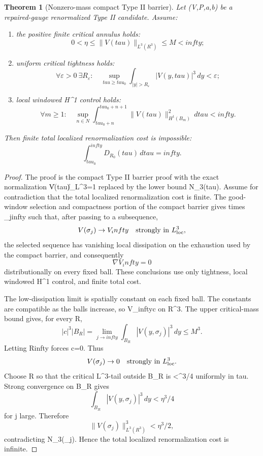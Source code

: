 \documentclass[11pt]{amsart}
\def\({}%
\def\){}%
\def\tilde#1{#1}%
\def\mathfrak#1{#1}%
\def\mathbb#1{#1}%
\def\tau{tau}%
\def\infty{infty}%
\theoremstyle{plain}
\newtheorem{theorem}{Theorem}[section]
\theoremstyle{definition}
\theoremstyle{remark}
\begin{document}
\begin{theorem}[Nonzero-mass compact Type II barrier]
\label{thm:c3-nonzero-mass-barrier}
Let \((V,P,a,b)\) be a repaired-gauge renormalized Type II candidate.  Assume:
\begin{enumerate}[label=\textup{(\roman*)}]
\item the positive finite critical annulus holds:
\[
  0<\eta\le \|V(\tau)\|_{L^3(\mathbb R^3)}\le M<\infty;
\]
\item uniform critical tightness holds:
\[
  \forall\varepsilon>0\ \exists R_\varepsilon:\quad
  \sup_{\tau\ge\tau_0}
  \int_{|y|>R_\varepsilon}|V(y,\tau)|^3\,dy<\varepsilon;
\]
\item local windowed \(H^1\) control holds:
\[
  \forall m\ge1:\quad
  \sup_{n\in\mathbb N}
  \int_{\tau_0+n}^{\tau_0+n+1}
  \|V(\tau)\|_{H^1(B_m)}^2\,d\tau<\infty.
\]
\end{enumerate}
Then finite total localized renormalization cost is impossible:
\[
  \int_{\tau_0}^{\infty}
  \tilde{\mathfrak D}_{R_0}(\tau)\,d\tau=\infty.
\]
\end{theorem}

\begin{proof}
The proof is the compact Type II barrier proof with the exact normalization
\(\|V(\tau)\|_{L^3}=1\) replaced by the lower bound
\(N_3(\tau)\ge\eta\).  Assume for contradiction that the total localized
renormalization cost is finite.  The good-window selection and compactness
portion of the compact barrier gives times \(\sigma_j\to\infty\) such that,
after passing to a subsequence,
\[
  V(\sigma_j)\to V_\infty\quad\text{strongly in }L^3_{\rm loc},
\]
the selected sequence has vanishing local dissipation on the exhaustion used by
the compact barrier, and consequently
\[
  \nabla V_\infty=0
\]
distributionally on every fixed ball.  These conclusions use only tightness,
local windowed \(H^1\) control, and finite total cost.

The low-dissipation limit is spatially constant on each fixed ball.  The
constants are compatible as the balls increase, so \(V_\infty\equiv c\) on
\(\mathbb R^3\).  The upper critical-mass bound gives, for every \(R\),
\[
  |c|^3|B_R|
  =
  \lim_{j\to\infty}\int_{B_R}|V(y,\sigma_j)|^3\,dy
  \le M^3 .
\]
Letting \(R\to\infty\) forces \(c=0\).  Thus
\[
  V(\sigma_j)\to0\quad\text{strongly in }L^3_{\rm loc}.
\]
Choose \(R\) so that the critical \(L^3\)-tail outside \(B_R\) is
\(<\eta^3/4\) uniformly in \(\tau\).  Strong convergence on \(B_R\) gives
\[
  \int_{B_R}|V(y,\sigma_j)|^3\,dy<\eta^3/4
\]
for \(j\) large.  Therefore
\[
  \|V(\sigma_j)\|_{L^3(\mathbb R^3)}^3<\eta^3/2,
\]
contradicting \(N_3(\sigma_j)\ge\eta\).  Hence the total localized
renormalization cost is infinite.
\end{proof}
\end{document}
